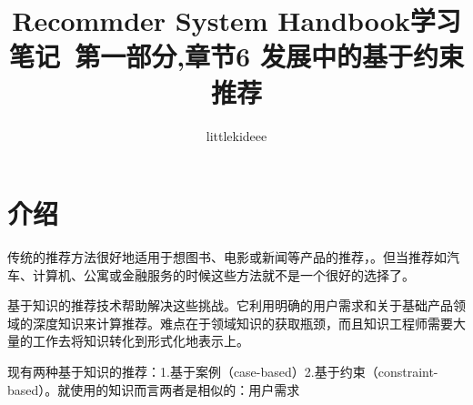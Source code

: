 \documentclass{article}
\begin{document}
 \title{Recommder System Handbook学习笔记\ 第一部分,章节6 发展中的基于约束推荐}
 \author{littlekideee}
 \maketitle

 \section{介绍}
 传统的推荐方法很好地适用于想图书、电影或新闻等产品的推荐，。但当推荐如汽车、计算机、公寓或金融服务的时候这些方法就不是一个很好的选择了。

 基于知识的推荐技术帮助解决这些挑战。它利用明确的用户需求和关于基础产品领域的深度知识来计算推荐。难点在于领域知识的获取瓶颈，而且知识工程师需要大量的工作去将知识转化到形式化地表示上。

 现有两种基于知识的推荐：1.基于案例（case-based）2.基于约束（constraint-based）。就使用的知识而言两者是相似的：用户需求
\end{document}
